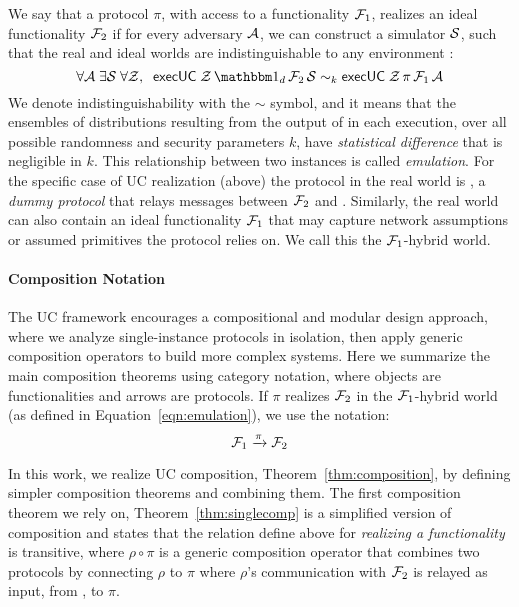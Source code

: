 We say that a protocol $\pi$, with access to a functionality $\mathcal{F}_1$, realizes an ideal functionality $\mathcal{F}_2$
if for every adversary $\mathcal{A}$, we can construct a simulator $\mathcal{S}$, such that the real and ideal worlds are indistinguishable to any environment \Z:
\begin{equation}
  \label{eqn:emulation}
  \forall \A \; \exists \Sim \; \forall \Z, \; \; \msf{execUC} \; \Z \, \idealP \, \F_2 \, \Sim \sim_k \msf{execUC} \; \Z \, \pi \, \F_1 \, \A
\end{equation}
We denote indistinguishability with the $\sim$ symbol, and it means that the ensembles of distributions resulting from the output of \Z
in each execution, over all possible randomness and security parameters $k$, have \emph{statistical difference} that is negligible in $k$.
This relationship between two  instances is called \emph{emulation}. 
For the specific case of UC realization (above) the protocol in the real world is \idealP, a \emph{dummy protocol} that relays messages between $\mathcal{F}_2$ and \Z.
Similarly, the real world can also contain an ideal functionality $\mathcal{F}_1$ that may capture network assumptions or assumed primitives the protocol relies on. 
We call this the $\mathcal{F}_1$-hybrid world.

\paragraph*{\textbf{Composition Notation}}
The UC framework encourages a compositional and modular design approach,
where we analyze single-instance protocols in isolation, then apply generic composition operators to build more complex systems.
Here we summarize the main composition theorems using category notation, where objects are functionalities and arrows are protocols.
If $\pi$ realizes $\mathcal{F}_2$ in the $\mathcal{F}_1$-hybrid world (as defined in Equation~\ref{eqn:emulation}), we use the notation:
\[
	\mathcal{F}_1 \xrightarrow{\pi} \mathcal{F}_2
\]

In this work, we realize UC composition, Theorem~\ref{thm:composition}, by defining simpler composition theorems and combining them.
The first composition theorem we rely on, Theorem~\ref{thm:singlecomp} is a simplified version of composition and states that the relation define above for \emph{realizing a functionality} is transitive, where $\rho \circ \pi$ is a generic composition operator that combines two protocols by connecting $\rho$ to $\pi$ where $\rho$'s communication with $\mathcal{F}_2$ is relayed as input, from \Z, to $\pi$. 

